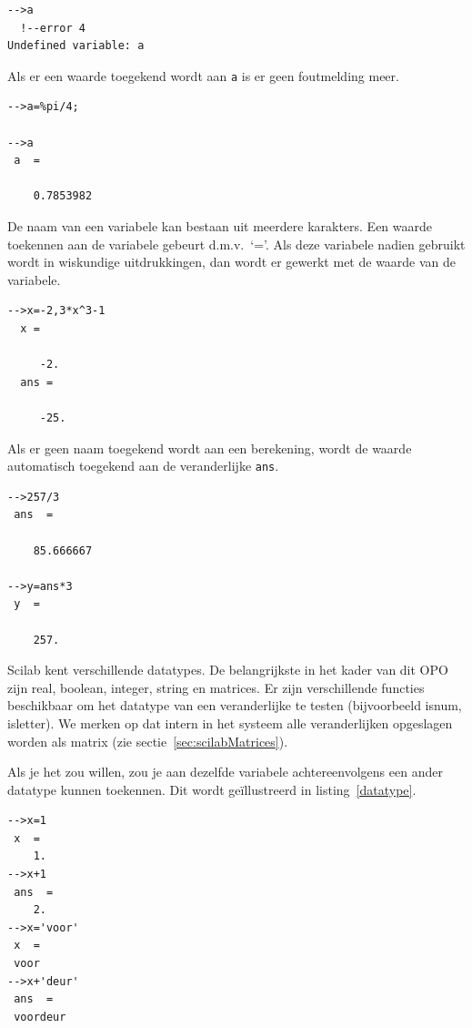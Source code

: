 \begin{lstlisting}[caption={Foutmelding bij niet-gedefinieerde variabele}, label=Foutmelding bij niet-gedefinieerde variabele]
-->a
  !--error 4 
Undefined variable: a
\end{lstlisting}

Als er een waarde toegekend wordt aan \verb+a+ is er geen foutmelding meer.
\begin{lstlisting}[caption={De waarde van een variabele}, label=De waarde van een variabele]
-->a=%pi/4;
 
-->a
 a  =
 
    0.7853982  
\end{lstlisting}

De naam van een variabele kan bestaan uit meerdere karakters. Een waarde toekennen aan de variabele gebeurt d.m.v.\ `='. Als deze variabele nadien gebruikt wordt in wiskundige uitdrukkingen, dan wordt er gewerkt met de waarde van de variabele. 

\begin{lstlisting}[caption={Waarde van variabelen}, label=waardevanvariabelen]
-->x=-2,3*x^3-1
  x =
     
     -2.
  ans =
     
     -25.
\end{lstlisting}

Als er geen naam toegekend wordt aan een berekening, wordt de waarde automatisch toegekend aan de veranderlijke \verb+ans+.
\begin{lstlisting}[caption={De variabele ans}, label=ans]
-->257/3
 ans  =
 
    85.666667  
 
-->y=ans*3
 y  =
 
    257.  
\end{lstlisting}

Scilab kent verschillende datatypes. De belangrijkste in het kader van dit OPO zijn real, boolean, integer, string en matrices. Er zijn verschillende functies beschikbaar om het datatype van een veranderlijke te testen (bijvoorbeeld isnum, isletter). We merken op dat intern in het systeem alle veranderlijken opgeslagen worden als matrix (zie sectie~\ref{sec:scilabMatrices}). 

Als je het zou willen, zou je aan dezelfde variabele  achtereenvolgens een ander datatype kunnen toekennen. Dit wordt geïllustreerd in listing~\ref{datatype}.

\begin{lstlisting}[caption={Verschillend datatype toekennen aan dezelfde veranderlijke}, label=datatype]
-->x=1
 x  =
    1.  
-->x+1
 ans  =
    2.  
-->x='voor'
 x  =
 voor   
-->x+'deur'
 ans  =
 voordeur  
 \end{lstlisting}



